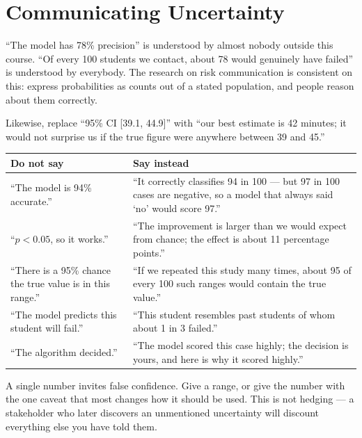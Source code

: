 \section{Communicating Uncertainty}

\begin{alertbox}
``The model has 78\% precision'' is understood by almost nobody outside this
course. ``Of every 100 students we contact, about 78 would genuinely have failed''
is understood by everybody. The research on risk communication is consistent on
this: express probabilities as counts out of a stated population, and people reason
about them correctly.

Likewise, replace ``95\% CI [39.1, 44.9]'' with ``our best estimate is 42 minutes;
it would not surprise us if the true figure were anywhere between 39 and 45.''
\end{alertbox}

\begin{longtable}{@{}L{5.6cm}L{8.4cm}@{}}
\toprule
{}
\textbf{Do not say} & \textbf{Say instead} \\
\midrule
\endhead
``The model is 94\% accurate.'' & ``It correctly classifies 94 in 100 --- but 97 in 100 cases are negative, so a model that always said `no' would score 97.'' \\
``$p < 0.05$, so it works.'' & ``The improvement is larger than we would expect from chance; the effect is about 11 percentage points.'' \\
``There is a 95\% chance the true value is in this range.'' & ``If we repeated this study many times, about 95 of every 100 such ranges would contain the true value.'' \\
``The model predicts this student will fail.'' & ``This student resembles past students of whom about 1 in 3 failed.'' \\
``The algorithm decided.'' & ``The model scored this case highly; the decision is yours, and here is why it scored highly.'' \\
\bottomrule
\end{longtable}

\begin{conceptbox}
A single number invites false confidence. Give a range, or give the number with the
one caveat that most changes how it should be used. This is not hedging --- a
stakeholder who later discovers an unmentioned uncertainty will discount everything
else you have told them.
\end{conceptbox}

